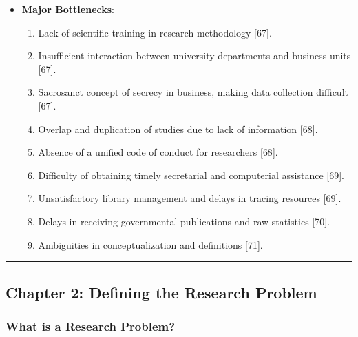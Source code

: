 \documentclass[
]{article}
\providecommand{\tightlist}{%
  \setlength{\itemsep}{0pt}\setlength{\parskip}{0pt}}
\begin{document}
\begin{itemize}
\tightlist
\item
  \textbf{Major Bottlenecks}:

  \begin{enumerate}
  \def\labelenumi{\arabic{enumi}.}
  \tightlist
  \item
    Lack of scientific training in research methodology {[}67{]}.
  \item
    Insufficient interaction between university departments and business
    units {[}67{]}.
  \item
    Sacrosanct concept of secrecy in business, making data collection
    difficult {[}67{]}.
  \item
    Overlap and duplication of studies due to lack of information
    {[}68{]}.
  \item
    Absence of a unified code of conduct for researchers {[}68{]}.
  \item
    Difficulty of obtaining timely secretarial and computerial
    assistance {[}69{]}.
  \item
    Unsatisfactory library management and delays in tracing resources
    {[}69{]}.
  \item
    Delays in receiving governmental publications and raw statistics
    {[}70{]}.
  \item
    Ambiguities in conceptualization and definitions {[}71{]}.
  \end{enumerate}
\end{itemize}

\begin{center}\rule{0.5\linewidth}{0.5pt}\end{center}

\subsection{Chapter 2: Defining the Research
Problem}\label{chapter-2-defining-the-research-problem}

\subsubsection{What is a Research
Problem?}\label{what-is-a-research-problem}
\end{document}
